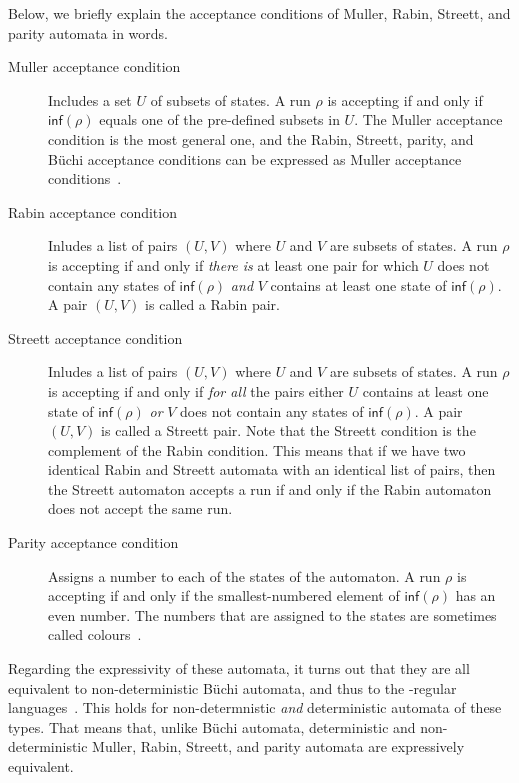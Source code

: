 Below, we briefly explain the acceptance conditions of Muller, Rabin, Streett, and parity automata in words.

{
\begin{description}
\item[Muller acceptance condition]
Includes a set $U$ of subsets of states. A run $\rho$ is accepting if and only if $\textsf{inf}(\rho)$ equals one of the pre-defined subsets in $U$. The Muller acceptance condition is the most general one, and the Rabin, Streett, parity, and Büchi acceptance conditions can be expressed as Muller acceptance conditions~\cite{2014_wilke,1999_loeding}.

\item[Rabin acceptance condition]
Inludes a list of pairs $(U, V)$ where $U$ and $V$ are subsets of states. A run $\rho$ is accepting if and only if \textit{there is} at least one pair for which $U$ does not contain any states of $\textsf{inf}(\rho)$ \textit{and} $V$ contains at least one state of $\textsf{inf}(\rho)$. A pair $(U, V)$ is called a Rabin pair.

\item[Streett acceptance condition]
Inludes a list of pairs $(U, V)$ where $U$ and $V$ are subsets of states. A run $\rho$ is accepting if and only if \textit{for all} the pairs either $U$ contains at least one state of $\textsf{inf}(\rho)$ \textit{or} $V$ does not contain any states of $\textsf{inf}(\rho)$. A pair $(U, V)$ is called a Streett pair. Note that the Streett condition is the complement of the Rabin condition. This means that if we have two identical Rabin and Streett automata with an identical list of pairs, then the Streett automaton accepts a run if and only if the Rabin automaton does not accept the same run.

\item[Parity acceptance condition]
Assigns a number to each of the states of the automaton. A run $\rho$ is accepting if and only if the smallest-numbered element of $\textsf{inf}(\rho)$ has an even number. The numbers that are assigned to the states are sometimes called colours~\cite{1999_loeding}.
\end{description}}

Regarding the expressivity of these automata, it turns out that they are all equivalent to non-deterministic Büchi automata, and thus to the \om-regular languages~\cite{2014_wilke}. This holds for non-determnistic \textit{and} deterministic automata of these types. That means that, unlike Büchi automata, deterministic and non-deterministic Muller, Rabin, Streett, and parity automata are expressively equivalent.

